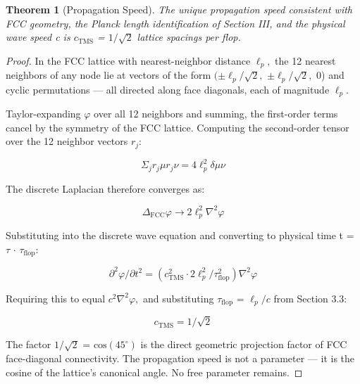 \documentclass[11pt,oneside]{report}
\newtheorem{theorem}{Theorem}[section]
\theoremstyle{definition}
\theoremstyle{remark}
\begin{document}
\begin{theorem}[Propagation Speed]
The unique propagation speed consistent
with FCC geometry, the Planck length identification of Section III, and
the physical wave speed c is \ensuremath{c_{\mathrm{TMS}}} = \ensuremath{1/\sqrt{2}} lattice spacings per flop.
\end{theorem}

\begin{proof}
In the FCC lattice with nearest-neighbor distance \ensuremath{\ell_{p},} the 12
nearest neighbors of any node lie at vectors of the form \ensuremath{(\pm \ell_{p}/\sqrt{2},}
\ensuremath{\pm \ell_{p}/\sqrt{2},} 0) and cyclic permutations --- all directed along face
diagonals, each of magnitude \ensuremath{\ell_{p}.}

Taylor-expanding \ensuremath{\varphi} over all 12 neighbors and summing, the first-order
terms cancel by the symmetry of the FCC lattice. Computing the
second-order tensor over the 12 neighbor vectors \ensuremath{r_{j}:}

\begin{equation*}
\Sigma_{j} r_{j}\mu r_{j}\nu = 4\ell^{2}_{p} \delta \mu \nu
\end{equation*}

The discrete Laplacian therefore converges as:

\begin{equation*}
\Delta_{\mathrm{FCC}} \varphi \to 2\ell^{2}_{p} \nabla ^{2}\varphi
\end{equation*}

Substituting into the discrete wave equation and converting to physical
time t = \ensuremath{\tau} \ensuremath{\cdot} \ensuremath{\tau_{\mathrm{flop}}:}

\begin{equation*}
\partial ^{2}\varphi / \partial t^{2} = ( c^{2}_{\mathrm{TMS}} \cdot 2\ell^{2}_{p} / \tau^{2}_{\mathrm{flop}} ) \nabla ^{2}\varphi
\end{equation*}

Requiring this to equal \ensuremath{c^{2}\nabla ^{2}\varphi ,} and substituting \ensuremath{\tau_{\mathrm{flop}}} = \ensuremath{\ell_{p}/c} from
Section 3.3:

\begin{equation*}
c_{\mathrm{TMS}} = 1/\sqrt{2}
\end{equation*}

The factor \ensuremath{1/\sqrt{2}} = \ensuremath{\text{cos}(45^{\circ})} is the direct geometric projection factor of
FCC face-diagonal connectivity. The propagation speed is not a parameter
--- it is the cosine of the lattice's canonical angle. No free parameter
remains.

\end{proof}
\end{document}
